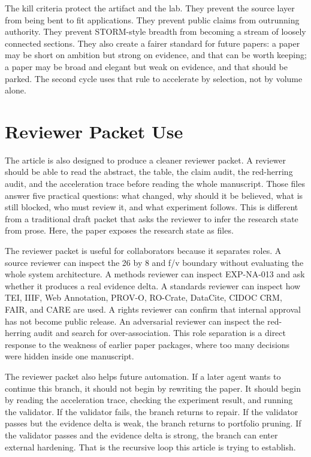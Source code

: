 \documentclass[sigconf,nonacm]{acmart}
\begin{document}
The kill criteria protect the artifact and the lab. They prevent the source
layer from being bent to fit applications. They prevent public claims from
outrunning authority. They prevent STORM-style breadth from becoming a stream of
loosely connected sections. They also create a fairer standard for future
papers: a paper may be short on ambition but strong on evidence, and that can be
worth keeping; a paper may be broad and elegant but weak on evidence, and that
should be parked. The second cycle uses that rule to accelerate by selection,
not by volume alone.

\section{Reviewer Packet Use}
The article is also designed to produce a cleaner reviewer packet. A reviewer
should be able to read the abstract, the table, the claim audit, the red-herring
audit, and the acceleration trace before reading the whole manuscript. Those
files answer five practical questions: what changed, why should it be believed,
what is still blocked, who must review it, and what experiment follows. This is
different from a traditional draft packet that asks the reviewer to infer the
research state from prose. Here, the paper exposes the research state as files.

The reviewer packet is useful for collaborators because it separates roles. A
source reviewer can inspect the 26 by 8 and f/v boundary without evaluating the
whole system architecture. A methods reviewer can inspect EXP-NA-013 and ask
whether it produces a real evidence delta. A standards reviewer can inspect how
TEI, IIIF, Web Annotation, PROV-O, RO-Crate, DataCite, CIDOC CRM, FAIR, and CARE
are used. A rights reviewer can confirm that internal approval has not become
public release. An adversarial reviewer can inspect the red-herring audit and
search for over-association. This role separation is a direct response to the
weakness of earlier paper packages, where too many decisions were hidden inside
one manuscript.

The reviewer packet also helps future automation. If a later agent wants to
continue this branch, it should not begin by rewriting the paper. It should
begin by reading the acceleration trace, checking the experiment result, and
running the validator. If the validator fails, the branch returns to repair. If
the validator passes but the evidence delta is weak, the branch returns to
portfolio pruning. If the validator passes and the evidence delta is strong, the
branch can enter external hardening. That is the recursive loop this article is
trying to establish.
\end{document}
